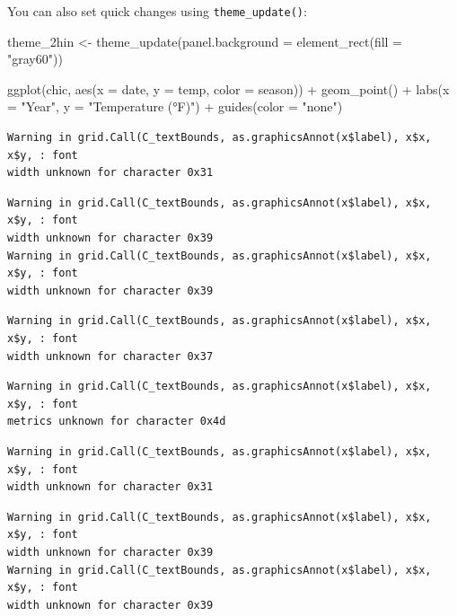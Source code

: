 \documentclass[
  letterpaper,
]{scrbook}
\newenvironment{Shaded}{\begin{snugshade}}{\end{snugshade}}
\newcommand{\AttributeTok}[1]{\textcolor[rgb]{0.40,0.45,0.13}{#1}}
\newcommand{\FunctionTok}[1]{\textcolor[rgb]{0.28,0.35,0.67}{#1}}
\newcommand{\NormalTok}[1]{\textcolor[rgb]{0.00,0.23,0.31}{#1}}
\newcommand{\OtherTok}[1]{\textcolor[rgb]{0.00,0.23,0.31}{#1}}
\newcommand{\SpecialCharTok}[1]{\textcolor[rgb]{0.37,0.37,0.37}{#1}}
\newcommand{\StringTok}[1]{\textcolor[rgb]{0.13,0.47,0.30}{#1}}
\begin{document}
You can also set quick changes using \texttt{theme\_update()}:

\begin{Shaded}
\begin{Highlighting}[]
\NormalTok{theme\_2hin }\OtherTok{\textless{}{-}} \FunctionTok{theme\_update}\NormalTok{(}\AttributeTok{panel.background =} \FunctionTok{element\_rect}\NormalTok{(}\AttributeTok{fill =} \StringTok{"gray60"}\NormalTok{))}

\FunctionTok{ggplot}\NormalTok{(chic, }\FunctionTok{aes}\NormalTok{(}\AttributeTok{x =}\NormalTok{ date, }\AttributeTok{y =}\NormalTok{ temp, }\AttributeTok{color =}\NormalTok{ season)) }\SpecialCharTok{+}
  \FunctionTok{geom\_point}\NormalTok{() }\SpecialCharTok{+} \FunctionTok{labs}\NormalTok{(}\AttributeTok{x =} \StringTok{"Year"}\NormalTok{, }\AttributeTok{y =} \StringTok{"Temperature (°F)"}\NormalTok{) }\SpecialCharTok{+} \FunctionTok{guides}\NormalTok{(}\AttributeTok{color =} \StringTok{"none"}\NormalTok{)}
\end{Highlighting}
\end{Shaded}

\begin{verbatim}
Warning in grid.Call(C_textBounds, as.graphicsAnnot(x$label), x$x, x$y, : font
width unknown for character 0x31
\end{verbatim}

\begin{verbatim}
Warning in grid.Call(C_textBounds, as.graphicsAnnot(x$label), x$x, x$y, : font
width unknown for character 0x39
Warning in grid.Call(C_textBounds, as.graphicsAnnot(x$label), x$x, x$y, : font
width unknown for character 0x39
\end{verbatim}

\begin{verbatim}
Warning in grid.Call(C_textBounds, as.graphicsAnnot(x$label), x$x, x$y, : font
width unknown for character 0x37
\end{verbatim}

\begin{verbatim}
Warning in grid.Call(C_textBounds, as.graphicsAnnot(x$label), x$x, x$y, : font
metrics unknown for character 0x4d
\end{verbatim}

\begin{verbatim}
Warning in grid.Call(C_textBounds, as.graphicsAnnot(x$label), x$x, x$y, : font
width unknown for character 0x31
\end{verbatim}

\begin{verbatim}
Warning in grid.Call(C_textBounds, as.graphicsAnnot(x$label), x$x, x$y, : font
width unknown for character 0x39
Warning in grid.Call(C_textBounds, as.graphicsAnnot(x$label), x$x, x$y, : font
width unknown for character 0x39
\end{verbatim}
\end{document}
